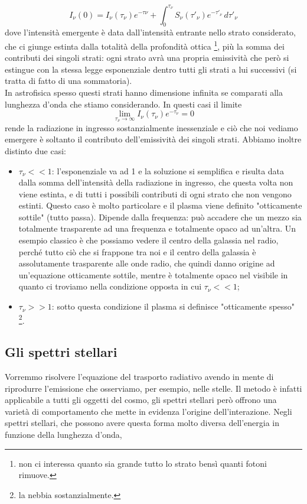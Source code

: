 \documentclass[a4paper,11pt]{article}
\begin{document}
    $$
    I_{\nu}(0) = I_{\nu}(\tau_{\nu})e^{-\tau{\nu}}+ \int_0^{\tau_{\nu}} S_{\nu}(\tau'_{\nu}) e^{-\tau'_{\nu}}\, d\tau'_{\nu}   
    $$
    dove l'intensità emergente è data dall'intensità entrante nello strato considerato, che ci giunge estinta dalla totalità della profondità ottica \footnote{non ci interessa quanto sia grande tutto lo strato bensì quanti fotoni rimuove.}, più la somma dei contributi dei singoli strati: ogni strato avrà una propria emissività che però si estingue con la stessa legge esponenziale dentro tutti gli strati a lui successivi (si tratta di fatto di una sommatoria).\\
    In astrofisica spesso questi strati hanno dimensione infinita se comparati alla lunghezza d'onda che stiamo considerando. In questi casi il limite
    $$
    \lim_{\tau_{\nu}\to\infty} I_{\nu}(\tau_{\nu})e^{-\tau_{\nu}}=0
    $$
    rende la radiazione in ingresso sostanzialmente inessenziale e ciò che noi vediamo emergere è soltanto il contributo dell'emissività dei singoli strati. Abbiamo inoltre distinto due casi:
     \begin{itemize}
        \item ${\tau_{\nu}<<1}$: l'esponenziale va ad 1 e la soluzione si semplifica e risulta data dalla somma dell'intensità della radiazione in ingresso, che questa volta non viene estinta, e di tutti i possibili contributi di ogni strato che non vengono estinti. Questo caso è molto particolare e il plasma viene definito "otticamente sottile" (tutto passa). Dipende dalla frequenza: può accadere che un mezzo sia totalmente trasparente ad una frequenza e totalmente opaco ad un'altra. Un esempio classico è che possiamo vedere il centro della galassia nel radio, perché tutto ciò che si frappone tra noi e il centro della galassia è assolutamente trasparente alle onde radio, che quindi danno origine ad un'equazione otticamente sottile, mentre è totalmente opaco nel visibile in quanto ci troviamo nella condizione opposta in cui ${\tau_{\nu}<<1}$;
        \item ${\tau_{\nu}>>1}$: sotto questa condizione il plasma si definisce "otticamente spesso" \footnote{la nebbia sostanzialmente.}.
    \end{itemize}

    \subsection{Gli spettri stellari}
    Vorremmo risolvere l'equazione del  trasporto radiativo avendo in mente di riprodurre l'emissione che osserviamo, per esempio, nelle stelle. Il metodo è infatti applicabile a tutti gli oggetti del cosmo, gli spettri stellari però offrono una varietà di comportamento che mette in evidenza l'origine dell'interazione. Negli spettri stellari, che possono avere questa forma molto diversa dell'energia in funzione della lunghezza d'onda,
    
\end{document}
